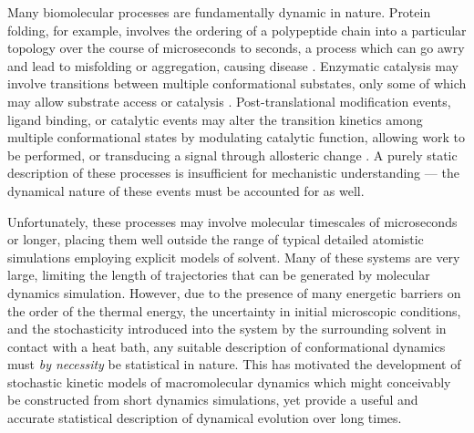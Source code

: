Many biomolecular processes are fundamentally dynamic in nature.
Protein folding, for example, involves the ordering of a polypeptide chain into a particular topology over the course of microseconds to seconds, a process which can go awry and lead to misfolding or aggregation, causing disease \cite{dobson:nature:2003:misfolding}.
Enzymatic catalysis may involve transitions between multiple conformational substates, only some of which may allow substrate access or catalysis \cite{kern:science:2002,youngblood:jbc:2006a,boehr:2006a}.
Post-translational modification events, ligand binding, or catalytic events may alter the transition kinetics among multiple conformational states by modulating catalytic function, allowing work to be performed, or transducing a signal through allosteric change \cite{frauenfelder:pnas:2001,changeux:2005a,maki:jbc:2006a}.
A purely static description of these processes is insufficient for mechanistic understanding --- the dynamical nature of these events must be accounted for as well.

Unfortunately, these processes may involve molecular timescales of microseconds or longer, placing them well outside the range of typical detailed atomistic simulations employing explicit models of solvent.
Many of these systems are very large, limiting the length of trajectories that can be generated by molecular dynamics simulation.
However, due to the presence of many energetic barriers on the order of the thermal energy, the uncertainty in initial microscopic conditions, and the stochasticity introduced into the system by the surrounding solvent in contact with a heat bath, any suitable description of conformational dynamics must \emph{by necessity} be statistical in nature.
This has motivated the development of stochastic kinetic models of macromolecular dynamics which might conceivably be constructed from short dynamics simulations, yet provide a useful and accurate statistical description of dynamical evolution over long times. 

